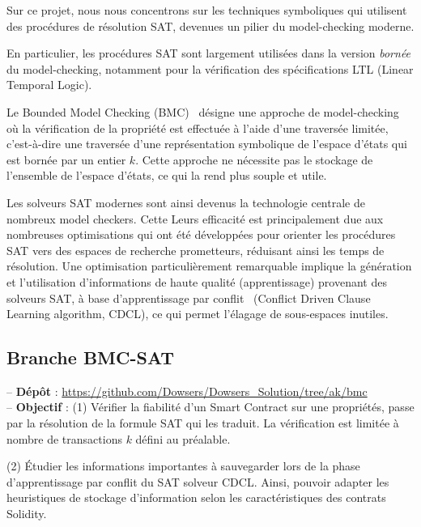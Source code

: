\documentclass{article}
\begin{document}
Sur ce projet, nous nous concentrons sur les techniques symboliques qui utilisent des procédures de résolution SAT, devenues un pilier du model-checking moderne. 

En particulier, les procédures SAT sont largement utilisées dans la version \textit{bornée} du model-checking, notamment pour la vérification des spécifications LTL (Linear Temporal Logic). 

Le Bounded Model Checking (BMC)~\cite{bmcbiere,bmcsat,symbolicMC2} désigne une approche de model-checking  où la vérification de la propriété est effectuée à l'aide d'une traversée limitée, c'est-à-dire une traversée d'une représentation symbolique de l'espace d'états qui est bornée par un entier $k$. Cette approche ne nécessite pas le stockage de l'ensemble de l'espace d'états, ce qui la rend plus souple et utile.



Les solveurs SAT modernes sont ainsi devenus la technologie centrale de nombreux model checkers. Cette
%
Leurs efficacité est principalement due aux nombreuses optimisations qui ont été développées pour orienter les procédures SAT vers des espaces de recherche prometteurs, réduisant ainsi les temps de résolution. Une optimisation particulièrement remarquable implique la génération et l'utilisation d'informations de haute qualité (apprentissage) provenant des solveurs SAT, à base d'apprentissage par conflit~\cite{grasp,MoskewiczMZZM01} (Conflict Driven Clause Learning algorithm, CDCL), ce qui permet l'élagage de sous-espaces inutiles.

\subsection{Branche BMC-SAT}
\hspace{0.5cm}-- \textbf{Dépôt} : \url{https://github.com/Dowsers/Dowsers_Solution/tree/ak/bmc} \\
  
  -- \textbf{Objectif} :  (1) Vérifier la fiabilité d'un Smart Contract sur une propriétés, passe par la résolution de la formule SAT qui les traduit. La vérification est limitée à nombre de transactions $k$ défini au préalable. 
  
  \hspace{2.1cm}(2) Étudier les informations importantes à sauvegarder lors de la phase d'apprentissage par conflit du SAT solveur CDCL. Ainsi, pouvoir adapter les heuristiques de stockage d'information selon les caractéristiques des contrats Solidity.  \\
\end{document}
